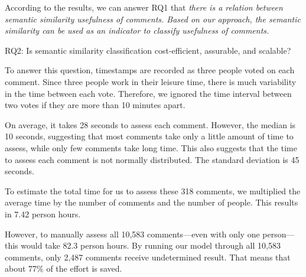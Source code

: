 According to the results, we can answer RQ1 that \emph{there is a relation between semantic similarity usefulness of comments. Based on our approach, the semantic similarity can be used as an indicator to classify usefulness of comments. }








\begin{ResearchQuestions}
\item[RQ2:] Is semantic similarity classification cost-efficient, assurable, and scalable?
\end{ResearchQuestions}

To answer this question, timestamps are recorded as three people voted on each comment.
Since three people work in their leisure time, there is much variability in the time between each vote.
Therefore, we ignored the time interval between two votes if they are more than 10 minutes apart.

On average, it takes 28 seconds to assess each comment.
However, the median is 10 seconds, suggesting that most comments take only a little amount of time to assess, while only few comments take long time.
This also suggests that the time to assess each comment is not normally distributed.
The standard deviation is 45 seconds.

To estimate the total time for us to assess these 318 comments,
we multiplied the average time by the number of comments and the number of people.
This results in 7.42 person hours.

However, to manually assess all 10,583 comments---even with only one person---this would take 82.3 person hours.
By running our model through all 10,583 comments, only 2,487 comments receive undetermined result.
That means that about 77\% of the effort is saved.

